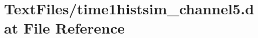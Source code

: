 \hypertarget{TextFiles_2time1histsim__channel5_8dat}{}\section{Text\+Files/time1histsim\+\_\+channel5.dat File Reference}
\label{TextFiles_2time1histsim__channel5_8dat}
